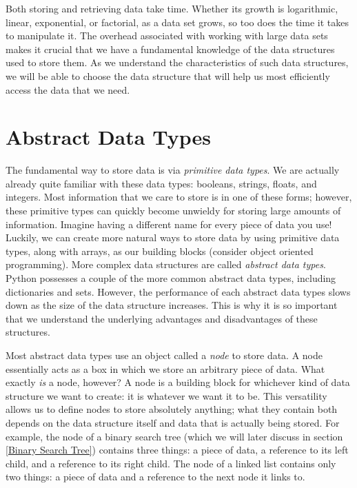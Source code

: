 \label{lab:Python_DataStructures}

Both storing and retrieving data take time.
Whether its growth is logarithmic, linear, exponential, or factorial, as a data set grows, so too does the time it takes to manipulate it.
The overhead associated with working with large data sets makes it crucial that we have a fundamental knowledge of the data structures used to store them.
As we understand the characteristics of such data structures, we will be able to choose the data structure that will help us most efficiently access the data that we need.

\section*{Abstract Data Types}

The fundamental way to store data is via \emph{primitive data types}.
We are actually already quite familiar with these data types: booleans, strings, floats, and integers.
Most information that we care to store is in one of these forms; however, these primitive types can quickly become unwieldy for storing large amounts of information.
Imagine having a different name for every piece of data you use!
Luckily, we can create more natural ways to store data by using primitive data types, along with arrays, as our building blocks (consider object oriented programming).
More complex data structures are called \emph{abstract data types}.
Python possesses a couple of the more common abstract data types, including dictionaries and sets.
However, the performance of each abstract data types slows down as the size of the data structure increases.
 This is why it is so important that we understand the underlying advantages and disadvantages of these structures.

Most abstract data types use an object called a \emph{node} to store data.
A node essentially acts as a box in which we store an arbitrary piece of data.
What exactly \emph{is} a node, however?
A node is a building block for whichever kind of data structure we want to create: it is whatever we want it to be.
This versatility allows us to define nodes to store absolutely anything; what they contain both depends on the data structure itself and data that is actually being stored.
For example, the node of a binary search tree (which we will later discuss in section \ref{Binary Search Tree}) contains three things: a piece of data, a reference to its left child, and a reference to its right child.
The node of a linked list contains only two things: a piece of data and a reference to the next node it links to.

